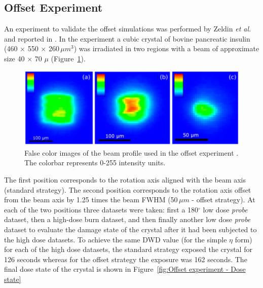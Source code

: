\subsection{Offset Experiment}
\label{sub:Offset Experiment}
An experiment to validate the offset simulations was performed by Zeldin \textit{et al.} and reported in \cite{zeldin2013dwd}.
In the experiment a cubic crystal of bovine pancreatic insulin (460 $\times$ 550 $\times$ 260$\,\mu m^3$) was irradiated in two regions with a beam of approximate size 40 $\times$ 70 $\mu$ (Figure~\ref{fig:Offset experiment - Beam}).
\begin{figure}
  \centering
    \includegraphics[width=1\textwidth]{figures/dwd/Oli_beams.png}
    \caption{False color images of the beam profile used in the offset experiment \cite{zeldin2013dwd}. The colorbar represents 0-255 intensity units.}
    \label{fig:Offset experiment - Beam}
\end{figure}
The first position corresponds to the rotation axis aligned with the beam axis (standard strategy).
The second position corresponds to the rotation axis offset from the beam axis by 1.25 times the beam FWHM (50$\,\mu m$ - offset strategy).
At each of the two positions three datasets were taken: first a 180$^{\circ}$ low dose \textit{probe} dataset, then a high-dose burn dataset, and then finally another low dose \textit{probe} dataset to evaluate the damage state of the crystal after it had been subjected to the high dose datasets.
To achieve the same DWD value (for the simple $\eta$ form) for each of the high dose datasets, the standard strategy exposed the crystal for 126 seconds whereas for the offset strategy the exposure was 162 seconds.
The final dose state of the crystal is shown in Figure~\ref{fig:Offset experiment - Dose state}
